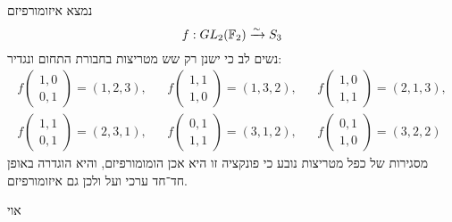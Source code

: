 \Subquestion{}
נמצא איזומורפיזם
\[
	f : GL_2(\mathbb{F}_2) \xrightarrow{\sim} S_3
\]
נשים לב כי ישנן רק שש מטריצות בחבורת התחום ונגדיר:
\begin{align*}
	f\begin{pmatrix}
		1, 0 \\
		0, 1
	\end{pmatrix} = (1, 2, 3),
	&& f\begin{pmatrix}
		1, 1 \\
		1, 0
	\end{pmatrix} = (1, 3, 2),
	&& f\begin{pmatrix}
		1, 0 \\
		1, 1
	\end{pmatrix} = (2, 1, 3), \\
	f\begin{pmatrix}
		1, 1 \\
		0, 1
	\end{pmatrix} = (2, 3, 1),
	&& f\begin{pmatrix}
		0, 1 \\
		1, 1
	\end{pmatrix} = (3, 1, 2),
	&& f\begin{pmatrix}
		0, 1 \\
		1, 0
	\end{pmatrix} = (3, 2, 2)
\end{align*}
מסגירות של כפל מטריצות נובע כי פונקציה זו היא אכן הומומורפיזם, והיא הוגדרה באופן חד־חד ערכי ועל ולכן גם איזומורפיזם.

\Subquestion{}
אוי


